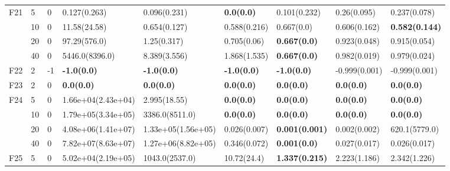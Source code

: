 \begin{longtable}{|l|l|l|l|l|l|l|l|l|}
F21            & 5   & 0        & 0.127(0.263)                  & 0.096(0.231)                & \textbf{0.0(0.0)}       & 0.101(0.232)              & 0.26(0.095)            & 0.237(0.078)          \\
\cmidrule{2-9} & 10  & 0        & 11.58(24.58)                  & 0.654(0.127)                & 0.588(0.216)            & 0.667(0.0)                & 0.606(0.162)           & \textbf{0.582(0.144)} \\
\cmidrule{2-9} & 20  & 0        & 97.29(576.0)                  & 1.25(0.317)                 & 0.705(0.06)             & \textbf{0.667(0.0)}       & 0.923(0.048)           & 0.915(0.054)          \\
\cmidrule{2-9} & 40  & 0        & 5446.0(8396.0)                & 8.389(3.556)                & 1.868(1.535)            & \textbf{0.667(0.0)}       & 0.982(0.019)           & 0.979(0.024)          \\ \hline
F22            & 2   & -1       & \textbf{-1.0(0.0)}            & \textbf{-1.0(0.0)}          & \textbf{-1.0(0.0)}      & \textbf{-1.0(0.0)}        & -0.999(0.001)          & -0.999(0.001)         \\ \hline
F23            & 2   & 0        & \textbf{0.0(0.0)}             & \textbf{0.0(0.0)}           & \textbf{0.0(0.0)}       & \textbf{0.0(0.0)}         & \textbf{0.0(0.0)}      & \textbf{0.0(0.0)}     \\ \hline
F24            & 5   & 0        & 1.66e+04(2.43e+04)            & 2.995(18.55)                & \textbf{0.0(0.0)}       & \textbf{0.0(0.0)}         & \textbf{0.0(0.0)}      & \textbf{0.0(0.0)}     \\
\cmidrule{2-9} & 10  & 0        & 1.79e+05(3.34e+05)            & 3386.0(8511.0)              & \textbf{0.0(0.0)}       & \textbf{0.0(0.0)}         & \textbf{0.0(0.0)}      & \textbf{0.0(0.0)}     \\
\cmidrule{2-9} & 20  & 0        & 4.08e+06(1.41e+07)            & 1.33e+05(1.56e+05)          & 0.026(0.007)            & \textbf{0.001(0.001)}     & 0.002(0.002)           & 620.1(5779.0)         \\
\cmidrule{2-9} & 40  & 0        & 7.82e+07(8.63e+07)            & 1.27e+06(8.82e+05)          & 0.346(0.072)            & \textbf{0.001(0.0)}       & 0.027(0.017)           & 0.026(0.017)          \\ \hline
F25            & 5   & 0        & 5.02e+04(2.19e+05)            & 1043.0(2537.0)              & 10.72(24.4)             & \textbf{1.337(0.215)}     & 2.223(1.186)           & 2.342(1.226)          \\

\end{longtable}
